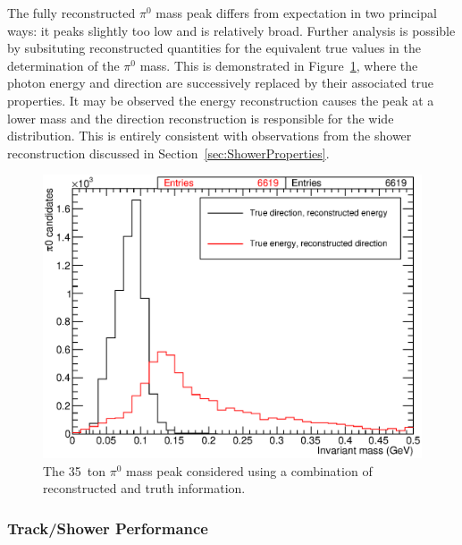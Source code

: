 The fully reconstructed $\pi^0$ mass peak differs from expectation in two principal ways: it peaks slightly too low and is relatively broad.  Further analysis is possible by subsituting reconstructed quantities for the equivalent true values in the determination of the $\pi^0$ mass.  This is demonstrated in Figure~\ref{fig:Pi0MassPeakTruth}, where the photon energy and direction are successively replaced by their associated true properties.  It may be observed the energy reconstruction causes the peak at a lower mass and the direction reconstruction is responsible for the wide distribution.  This is entirely consistent with observations from the shower reconstruction discussed in Section~\ref{sec:ShowerProperties}.

\begin{figure}
  \centering
  \includegraphics[width=12cm]{Pi0MassPeakTruth.eps}
  \caption[The 35~ton $\pi^0$ mass peak considered using a combination of reconstructed and truth information.]{The 35~ton $\pi^0$ mass peak considered using a combination of reconstructed and truth information.}
  \label{fig:Pi0MassPeakTruth}
\end{figure}

\subsubsection{Track/Shower Performance}\label{sec:TrackShowerPerformance}

